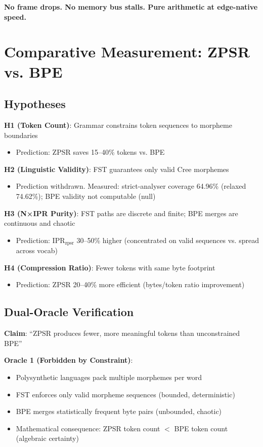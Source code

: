 \documentclass[11pt,oneside]{article}
\begin{document}
\textbf{No frame drops. No memory bus stalls. Pure arithmetic at edge-native speed.}

\section{Comparative Measurement: ZPSR vs. BPE}

\subsection{Hypotheses}

\textbf{H1 (Token Count)}: Grammar constrains token sequences to morpheme boundaries
\begin{itemize}
  \item Prediction: ZPSR saves 15--40\% tokens vs. BPE
\end{itemize}

\textbf{H2 (Linguistic Validity)}: FST guarantees only valid Cree morphemes
\begin{itemize}
  \item Prediction withdrawn. Measured: strict-analyser coverage 64.96\% (relaxed 74.62\%); BPE validity not computable (null)
\end{itemize}

\textbf{H3 (N×IPR Purity)}: FST paths are discrete and finite; BPE merges are continuous and chaotic
\begin{itemize}
  \item Prediction: IPR$_{\text{zpsr}}$ 30--50\% higher (concentrated on valid sequences vs. spread across vocab)
\end{itemize}

\textbf{H4 (Compression Ratio)}: Fewer tokens with same byte footprint
\begin{itemize}
  \item Prediction: ZPSR 20--40\% more efficient (bytes/token ratio improvement)
\end{itemize}

\subsection{Dual-Oracle Verification}

\textbf{Claim}: ``ZPSR produces fewer, more meaningful tokens than unconstrained BPE''

\textbf{Oracle 1 (Forbidden by Constraint)}:
\begin{itemize}
  \item Polysynthetic languages pack multiple morphemes per word
  \item FST enforces only valid morpheme sequences (bounded, deterministic)
  \item BPE merges statistically frequent byte pairs (unbounded, chaotic)
  \item Mathematical consequence: ZPSR token count $<$ BPE token count (algebraic certainty)
\end{itemize}
\end{document}
